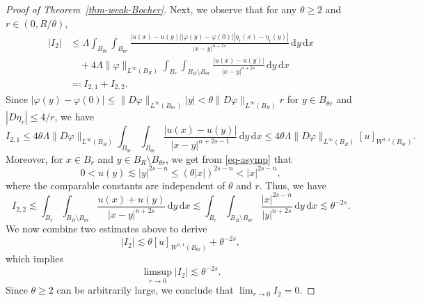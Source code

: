 \documentclass[11pt]{amsart}
\theoremstyle{plain}
\theoremstyle{definition}
\numberwithin{equation}{section}
\begin{document}
\begin{proof}[Proof of Theorem~\ref{thm-weak-Bocher}]
Next, we observe that for any $\theta \geq 2$ and $r \in (0, R/\theta)$,
\begin{equation*}
	\begin{aligned}
		|I_2| &\leq \Lambda \int_{B_{\theta r}} \int_{B_{\theta r}} \frac{|u(x)-u(y)||\varphi(y)-\varphi(0)||\eta_r(x)-\eta_r(y)|}{|x-y|^{n+2s}}\,\mathrm{d}y\,\mathrm{d}x\\
		&\quad+4\Lambda\|\varphi\|_{L^\infty(B_R)} \int_{B_{r}} \int_{B_R \setminus B_{\theta r}} \frac{|u(x)-u(y)|}{|x-y|^{n+2s}}\,\mathrm{d}y\,\mathrm{d}x\\
		&\eqqcolon I_{2, 1}+I_{2,2}.
	\end{aligned}
\end{equation*}
Since $|\varphi(y)-\varphi(0)| \leq \|D\varphi\|_{L^\infty(B_{\theta r})}|y| < \theta\|D\varphi\|_{L^\infty(B_{R})}r$ for $y \in B_{\theta r}$ and $|D\eta_r|\leq 4/r$, we have
\begin{equation*}
	I_{2,1} \leq 4\theta\Lambda\|D\varphi\|_{L^\infty(B_{R})} \int_{B_{\theta r}} \int_{B_{\theta r}} \frac{|u(x)-u(y)|}{|x-y|^{n+2s-1}}\,\mathrm{d}y\,\mathrm{d}x \leq 4\theta\Lambda\|D\varphi\|_{L^\infty(B_{R})}[u]_{W^{\sigma, 1}(B_{\theta r})}.
\end{equation*}
Moreover, for $x \in B_{r}$ and $y \in B_R \setminus B_{\theta r}$, we get from \eqref{eq-asymp} that
\begin{equation*}
	0<u(y) \lesssim |y|^{2s-n} \leq (\theta|x|)^{2s-n} < |x|^{2s-n},
\end{equation*}
where the comparable constants are independent of $\theta$ and $r$. Thus, we have
\begin{equation*}
	I_{2, 2} \lesssim \int_{B_{r}} \int_{B_R \setminus B_{\theta r}} \frac{u(x)+u(y)}{|x-y|^{n+2s}}\,\mathrm{d}y\,\mathrm{d}x \lesssim \int_{B_{r}} \int_{B_R \setminus B_{\theta r}} \frac{|x|^{2s-n}}{|y|^{n+2s}}\,\mathrm{d}y\,\mathrm{d}x \lesssim \theta^{-2s}.
\end{equation*}
We now combine two estimates above to derive
\begin{equation*}
    |I_2| \lesssim \theta[u]_{W^{\sigma, 1}(B_{\theta r})}+\theta^{-2s},
\end{equation*}
which implies
\begin{equation*}
    \limsup_{r \to 0}|I_2| \lesssim \theta^{-2s}.
\end{equation*}
Since $\theta\geq2$ can be arbitrarily large, we conclude that $\lim_{r \to 0}I_2=0$.


\end{proof}
\end{document}
